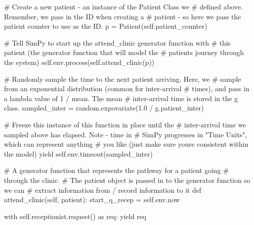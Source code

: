 \documentclass[
  letterpaper,
  DIV=11,
  numbers=noendperiod]{scrreprt}
\newenvironment{Shaded}{}{}
\newcommand{\CommentTok}[1]{\textcolor[rgb]{0.42,0.45,0.49}{#1}}
\newcommand{\ControlFlowTok}[1]{\textcolor[rgb]{0.84,0.23,0.29}{#1}}
\newcommand{\FloatTok}[1]{\textcolor[rgb]{0.00,0.36,0.77}{#1}}
\newcommand{\ImportTok}[1]{\textcolor[rgb]{0.01,0.18,0.38}{#1}}
\newcommand{\KeywordTok}[1]{\textcolor[rgb]{0.84,0.23,0.29}{#1}}
\newcommand{\NormalTok}[1]{\textcolor[rgb]{0.14,0.16,0.18}{#1}}
\newcommand{\OperatorTok}[1]{\textcolor[rgb]{0.14,0.16,0.18}{#1}}
\newcommand{\VariableTok}[1]{\textcolor[rgb]{0.89,0.38,0.04}{#1}}
\begin{document}
\begin{tcolorbox}
\begin{Shaded}
\begin{Highlighting}[]
            \CommentTok{\# Create a new patient {-} an instance of the Patient Class we}
            \CommentTok{\# defined above.  Remember, we pass in the ID when creating a}
            \CommentTok{\# patient {-} so here we pass the patient counter to use as the ID.}
\NormalTok{            p }\OperatorTok{=}\NormalTok{ Patient(}\VariableTok{self}\NormalTok{.patient\_counter)}

            \CommentTok{\# Tell SimPy to start up the attend\_clinic generator function with}
            \CommentTok{\# this patient (the generator function that will model the}
            \CommentTok{\# patient\textquotesingle{}s journey through the system)}
            \VariableTok{self}\NormalTok{.env.process(}\VariableTok{self}\NormalTok{.attend\_clinic(p))}

            \CommentTok{\# Randomly sample the time to the next patient arriving.  Here, we}
            \CommentTok{\# sample from an exponential distribution (common for inter{-}arrival}
            \CommentTok{\# times), and pass in a lambda value of 1 / mean.  The mean}
            \CommentTok{\# inter{-}arrival time is stored in the g class.}
\NormalTok{            sampled\_inter }\OperatorTok{=}\NormalTok{ random.expovariate(}\FloatTok{1.0} \OperatorTok{/}\NormalTok{ g.patient\_inter)}

            \CommentTok{\# Freeze this instance of this function in place until the}
            \CommentTok{\# inter{-}arrival time we sampled above has elapsed.  Note {-} time in}
            \CommentTok{\# SimPy progresses in "Time Units", which can represent anything}
            \CommentTok{\# you like (just make sure you\textquotesingle{}re consistent within the model)}
            \ControlFlowTok{yield} \VariableTok{self}\NormalTok{.env.timeout(sampled\_inter)}

    \CommentTok{\# A generator function that represents the pathway for a patient going}
    \CommentTok{\# through the clinic.}
    \CommentTok{\# The patient object is passed in to the generator function so we can}
    \CommentTok{\# extract information from / record information to it}
    \KeywordTok{def}\NormalTok{ attend\_clinic(}\VariableTok{self}\NormalTok{, patient):}
\NormalTok{        start\_q\_recep }\OperatorTok{=} \VariableTok{self}\NormalTok{.env.now}

        \ControlFlowTok{with} \VariableTok{self}\NormalTok{.receptionist.request() }\ImportTok{as}\NormalTok{ req:}
            \ControlFlowTok{yield}\NormalTok{ req}


\end{Highlighting}
\end{Shaded}
\end{tcolorbox}
\end{document}
